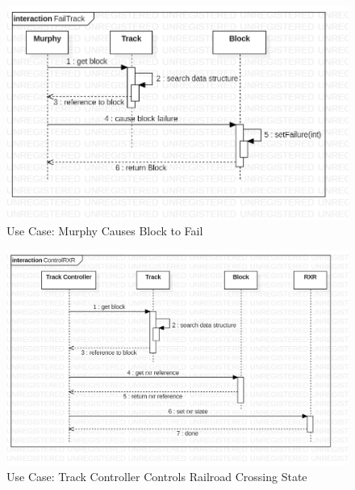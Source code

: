 \documentclass{article}
\begin{document}
    \begin{figure}[H]
        \centering
        \includegraphics[width=\textwidth]{./SequenceDiagrams/TrackModel_SeqDiagrams/TrackModel_SeqDiagram_MurphyFailsBlock.png}
        \caption{Use Case: Murphy Causes Block to Fail}
        \label{fig:Murphy Fails Block}
    \end{figure}
    \begin{figure}[H]
        \centering
        \includegraphics[width=\textwidth]{./SequenceDiagrams/TrackModel_SeqDiagrams/TrackModel_SeqDiagram_TKCControlsRXR.png}
        \caption{Use Case: Track Controller Controls Railroad Crossing State}
        \label{fig:Track Controller Controls RXR}
    \end{figure}
\end{document}
